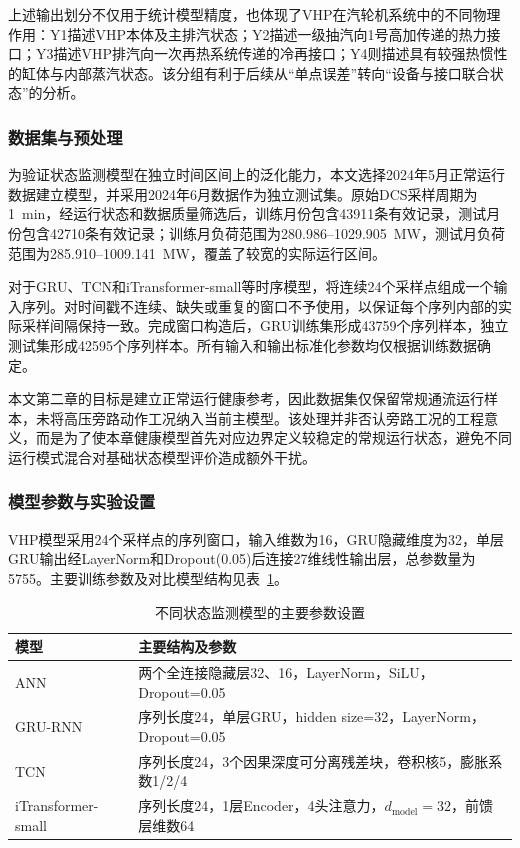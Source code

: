 上述输出划分不仅用于统计模型精度，也体现了VHP在汽轮机系统中的不同物理作用：Y1描述VHP本体及主排汽状态；Y2描述一级抽汽向1号高加传递的热力接口；Y3描述VHP排汽向一次再热系统传递的冷再接口；Y4则描述具有较强热惯性的缸体与内部蒸汽状态。该分组有利于后续从“单点误差”转向“设备与接口联合状态”的分析。

\subsubsection{数据集与预处理}

为验证状态监测模型在独立时间区间上的泛化能力，本文选择2024年5月正常运行数据建立模型，并采用2024年6月数据作为独立测试集。原始DCS采样周期为1~min，经运行状态和数据质量筛选后，训练月份包含43911条有效记录，测试月份包含42710条有效记录；训练月负荷范围为280.986--1029.905~MW，测试月负荷范围为285.910--1009.141~MW，覆盖了较宽的实际运行区间。

对于GRU、TCN和iTransformer-small等时序模型，将连续24个采样点组成一个输入序列。对时间戳不连续、缺失或重复的窗口不予使用，以保证每个序列内部的实际采样间隔保持一致。完成窗口构造后，GRU训练集形成43759个序列样本，独立测试集形成42595个序列样本。所有输入和输出标准化参数均仅根据训练数据确定。

本文第二章的目标是建立正常运行健康参考，因此数据集仅保留常规通流运行样本，未将高压旁路动作工况纳入当前主模型。该处理并非否认旁路工况的工程意义，而是为了使本章健康模型首先对应边界定义较稳定的常规运行状态，避免不同运行模式混合对基础状态模型评价造成额外干扰。

\subsubsection{模型参数与实验设置}

VHP模型采用24个采样点的序列窗口，输入维数为16，GRU隐藏维度为32，单层GRU输出经LayerNorm和Dropout(0.05)后连接27维线性输出层，总参数量为5755。主要训练参数及对比模型结构见表~\ref{tab:model_settings}。

\begin{table}[htbp]
\centering
\caption{不同状态监测模型的主要参数设置}
\label{tab:model_settings}
\small
\begin{tabular}{lp{9.5cm}}
\toprule
模型 & 主要结构及参数\\
\midrule
ANN & 两个全连接隐藏层32、16，LayerNorm，SiLU，Dropout=0.05\\
GRU-RNN & 序列长度24，单层GRU，hidden size=32，LayerNorm，Dropout=0.05\\
TCN & 序列长度24，3个因果深度可分离残差块，卷积核5，膨胀系数1/2/4\\
iTransformer-small & 序列长度24，1层Encoder，4头注意力，$d_{\mathrm{model}}=32$，前馈层维数64\\
\bottomrule
\end{tabular}
\end{table}

